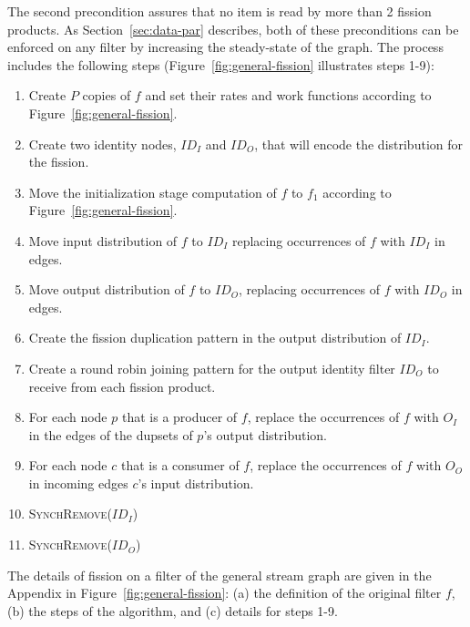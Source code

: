 \noindent The second precondition assures that no item is read by more
than 2 fission products.  As Section~\ref{sec:data-par} describes,
both of these preconditions can be enforced on any filter by
increasing the steady-state of the graph.  The process includes the
following steps (Figure~\ref{fig:general-fission} illustrates steps
1-9): 
\begin{enumerate}
\item Create $P$ copies of $f$ and set their rates
and work functions according to Figure~\ref{fig:general-fission}.
\item Create two identity nodes, $ID_I$ and $ID_O$, that will encode
  the distribution for the fission.
\item Move the initialization stage computation of $f$ to $f_1$
  according to Figure~\ref{fig:general-fission}. 
\item Move input distribution of $f$ to $ID_I$
replacing occurrences of $f$ with $ID_I$ in edges.
\item Move output distribution of $f$ to $ID_O$, replacing
occurrences of $f$ with $ID_O$ in edges.
\item Create the fission duplication pattern in the
output distribution of $ID_I$.
\item Create a round robin joining pattern for the output identity
  filter $ID_O$ to receive from each fission product.
\item For each node $p$ that is a producer of $f$, replace the
 occurrences of $f$ with $O_I$ in the edges of the dupsets of $p$'s
 output distribution.
\item For each node $c$ that is a consumer of $f$, replace the
 occurrences of $f$ with $O_O$ in incoming edges $c$'s input
 distribution.
\item \textsc{SynchRemove}($ID_I$)
\item \textsc{SynchRemove}($ID_O$)
\end{enumerate}

The details of fission on a filter of the general stream graph are
given in the Appendix in Figure~\ref{fig:general-fission}: (a) the
definition of the original filter $f$, (b) the steps of the algorithm,
and (c) details for steps 1-9.

